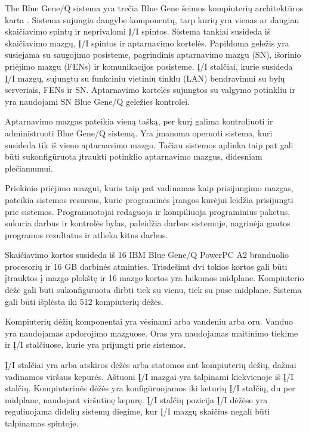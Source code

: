 The Blue Gene/Q sistema yra trečia Blue Gene šeimos kompiuterių architektūros karta \cite{gilge2014ibm}.
Sistema sujungia daugybe komponentų, tarp kurių yra vienas ar daugiau skaičiavimo spintų ir neprivalomi Į/I spintos.
Sistema tankiai susideda iš skaičiavimo mazgų, Į/I spintos ir aptarnavimo kortelės.
Papildoma geležis yra susiejama su saugojimo posisteme, pagrindinis aptarnavimo mazgu (SN), išorinio priėjimo mazgu (FENs) ir komunikacijos posisteme.
Į/I stalčiai, kurie susideda Į/I mazgų, sujungtu su funkciniu vietiniu tinklu (LAN) bendravimui su bylų serveriais, FENs ir SN.
Aptarnavimo kortelės sujungtos su valgymo potinkliu ir yra naudojami SN Blue Gene/Q geležies kontrolei.

Aptarnavimo mazgas pateikia vieną tašką, per kurį galima kontroliuoti ir administruoti Blue Gene/Q sistemą.
Yra įmanoma operuoti sistema, kuri susideda tik iš vieno aptarnavimo mazgo.
Tačiau sistemos aplinka taip pat gali būti sukonfigūruota įtraukti potinklio aptarnavimo mazgus, didesniam plečiamumui.

Priekinio priėjimo mazgui, kuris taip pat vadinamas kaip prisijungimo mazgas, pateikia sistemos resursus, kurie programinės įrangos kūrėjui leidžia prisijungti prie sistemos.
Programuotojai redaguoja ir kompiliuoja programinius paketus, sukuria darbus ir kontrolės bylas, paleidžia darbus sistemoje, nagrinėja gautos programos rezultatus ir atlieka kitus darbus.

Skaičiavimo kortos susideda iš 16 IBM Blue Gene/Q PowerPC A2 branduolio procesorių ir 16 GB darbinės atminties.
Trisdešimt dvi tokios kortos gali būti įtrauktos į mazgo plokštę ir 16 mazgo kortos yra laikomos midplane.
Kompiuterio dėžė gali būti sukonfigūruota dirbti tiek su vienu, tiek su puse midplane.
Sistema gali būti išplėsta iki 512 kompiuterių dėžės.

Kompiuterių dėžių komponentai yra vėsinami arba vandeniu arba oru.
Vanduo yra naudojamas apdorojimo mazguose.
Oras yra naudojamas maitinimo tiekime ir Į/I stalčiuose, kurie yra prijungti prie sistemos.

Į/I stalčiai yra arba atskiros dėžės arba statomos ant kompiuterių dėžių, dažnai vadinamos viršaus kepurės.
Aštuoni Į/I mazgai yra talpinami kiekvienoje iš Į/I stalčių.
Kompiuterinės dėžės yra konfigūruojamos iki keturių Į/I stalčių, du per midplane, naudojant viršutinę kepurę.
Į/I stalčių pozicija Į/I dėžėse yra reguliuojama didelių sistemų diegime, kur Į/I mazgų skaičius negali būti talpinamas spintoje.




